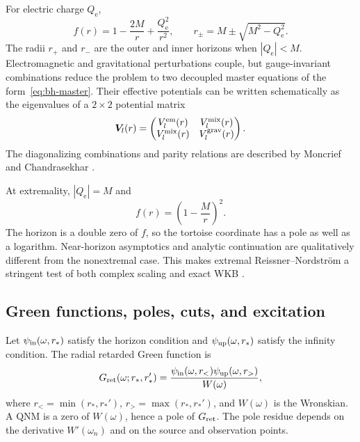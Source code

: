 For electric charge $Q_{\mathrm e}$,
\begin{equation}
  f(r)=1-\frac{2M}{r}+\frac{Q_{\mathrm e}^2}{r^2},
  \qquad
  r_{\pm}=M\pm\sqrt{M^2-Q_{\mathrm e}^2} .
  \label{eq:rn-metric-function}
\end{equation}
The radii $r_+$ and $r_-$ are the outer and inner horizons when
$|Q_{\mathrm e}|<M$.  Electromagnetic and gravitational perturbations couple,
but gauge-invariant combinations reduce the problem to two decoupled master
equations of the form~\eqref{eq:bh-master}.  Their effective potentials can be
written schematically as the eigenvalues of a $2\times2$ potential matrix
\begin{equation}
  \bm V_l(r)
  =\begin{pmatrix}
  V_l^{\mathrm{em}}(r)&V_l^{\mathrm{mix}}(r)\\
  V_l^{\mathrm{mix}}(r)&V_l^{\mathrm{grav}}(r)
  \end{pmatrix} .
  \label{eq:rn-potential-matrix}
\end{equation}
The diagonalizing combinations and parity relations are described by
Moncrief and Chandrasekhar
\cite{Moncrief:1974gw,Moncrief:1974ng,Chandrasekhar:book}.

At extremality, $|Q_{\mathrm e}|=M$ and
\begin{equation}
  f(r)=\left(1-\frac{M}{r}\right)^2 .
  \label{eq:extremal-rn-f}
\end{equation}
The horizon is a double zero of $f$, so the tortoise coordinate has a pole as
well as a logarithm.  Near-horizon asymptotics and analytic continuation are
qualitatively different from the nonextremal case.  This makes extremal
Reissner--Nordstr\"om a stringent test of both complex scaling and exact WKB
\cite{Onozawa:1995vu,Ogawa:2026veu,HatsudaShiga:2026}.

\subsection{Green functions, poles, cuts, and excitation}
\label{subsec:bh-green-function}

Let $\psi_{\mathrm{in}}(\omega,r_*)$ satisfy the horizon condition and
$\psi_{\mathrm{up}}(\omega,r_*)$ satisfy the infinity condition.  The radial
retarded Green function is
\begin{equation}
  G_{\mathrm{ret}}(\omega;r_*,r_*')
  =\frac{
  \psi_{\mathrm{in}}(\omega,r_<)
  \psi_{\mathrm{up}}(\omega,r_>)}
  {W(\omega)} ,
  \label{eq:bh-green-function}
\end{equation}
where $r_<=\min(r_*,r_*')$, $r_>=\max(r_*,r_*')$, and $W(\omega)$ is the
Wronskian.  A QNM is a zero of $W(\omega)$, hence a pole of
$G_{\mathrm{ret}}$.  The pole residue depends on the derivative
$W'(\omega_n)$ and on the source and observation points.

